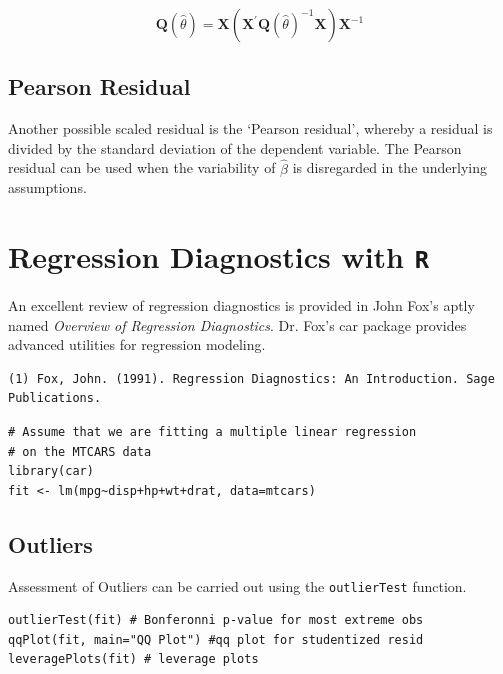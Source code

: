 \documentclass[12pt, a4paper]{article}
\theoremstyle{plain}
\theoremstyle{definition}
\theoremstyle{remark}
\begin{document}
\[ \boldsymbol{Q} (\hat{\theta}) = \boldsymbol{X} ( \boldsymbol{X}^{\prime}\boldsymbol{Q} (\hat{\theta})^{-1}\boldsymbol{X})\boldsymbol{X}^{-1} \]

\subsection{Pearson Residual}%

Another possible scaled residual is the  `Pearson residual', whereby a residual is divided by the standard deviation of the dependent variable. The Pearson residual can be used when the variability of $\hat{\beta}$ is disregarded in the underlying assumptions.






\newpage
\section{Regression Diagnostics with \texttt{R} }

An excellent review of regression diagnostics is provided in John Fox's aptly named \textit{Overview of Regression Diagnostics}. Dr. Fox's car package provides advanced utilities for regression modeling.

\begin{verbatim}
(1) Fox, John. (1991). Regression Diagnostics: An Introduction. Sage Publications.
\end{verbatim}

\begin{framed}
\begin{verbatim}
# Assume that we are fitting a multiple linear regression
# on the MTCARS data
library(car)
fit <- lm(mpg~disp+hp+wt+drat, data=mtcars)

\end{verbatim}
\end{framed}


\subsection{Outliers}

Assessment of Outliers can be carried out using the \texttt{outlierTest} function.

\begin{framed}
\begin{verbatim}
outlierTest(fit) # Bonferonni p-value for most extreme obs
qqPlot(fit, main="QQ Plot") #qq plot for studentized resid 
leveragePlots(fit) # leverage plots
\end{verbatim}
\end{framed}
\end{document}
